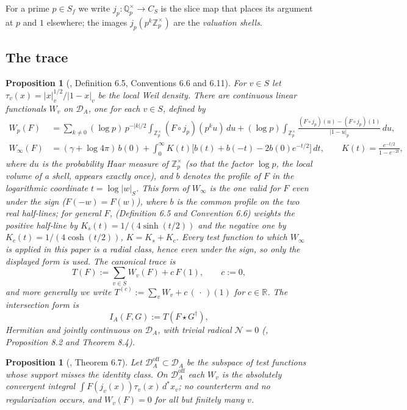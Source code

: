 \documentclass[11pt]{amsart}
\newtheorem{proposition}[theorem]{Proposition}
\theoremstyle{definition}
\theoremstyle{remark}
\newcommand{\R}{\mathbb R}
\newcommand{\Z}{\mathbb Z}
\newcommand{\Q}{\mathbb Q}
\newcommand{\DA}{\mathcal D_A}
\newcommand{\CS}{C_S}
\begin{document}
For a prime $p\in S_f$ we write $j_p\colon\Q_p^\times\to\CS$ is the slice map that
places its argument at $p$ and $1$ elsewhere; the images
$j_p(p^k\Z_p^\times)$ are the \emph{valuation shells}.

\subsection{The trace}

\begin{proposition}[\cite{P43}, Definition 6.5, Conventions 6.6 and 6.11]
\label{prop:trace}
For $v\in S$ let $\tau_v(x)=|x|_v^{1/2}/|1-x|_v$ be the local Weil density.
There are continuous linear functionals $W_v$ on $\DA$, one for each $v\in S$,
defined by
\begin{align*}
  W_p(F)&=\sum_{k\ne0}(\log p)\,p^{-|k|/2}\!\!\int_{\Z_p^\times}\!\!
      (F\circ j_p)(p^ku)\,du
     +(\log p)\!\int_{\Z_p^\times}\!\frac{(F\circ j_p)(u)-(F\circ j_p)(1)}{|1-u|_p}\,du,\\
  W_\infty(F)&=(\gamma+\log4\pi)\,b(0)
     +\int_0^\infty K(t)\bigl[b(t)+b(-t)-2b(0)e^{-t/2}\bigr]\,dt,
  \qquad K(t)=\frac{e^{-t/2}}{1-e^{-2t}},
\end{align*}
where $du$ is the probability Haar measure of $\Z_p^\times$ (so that the
factor $\log p$, the local volume of a shell, appears exactly once), and $b$
denotes the profile of $F$ in the logarithmic coordinate $t=\log|w|_S$.
This form of $W_\infty$ is the one valid for $F$ even under the sign
($F(-w)=F(w)$), where $b$ is the common profile on the two real half-lines;
for general $F$, \cite{P43} (Definition 6.5 and Convention 6.6)
weights the positive half-line by $K_s(t)=1/(4\sinh(t/2))$ and the negative
one by $K_c(t)=1/(4\cosh(t/2))$, $K=K_s+K_c$.  Every test function to which
$W_\infty$ is applied in this paper is a radial class, hence even under the
sign, so only the displayed form is used.  The \emph{canonical trace} is
\[
  T(F):=\sum_{v\in S}W_v(F)+c\,F(1),\qquad c:=0 ,
  \tag{2.3}
\]
and more generally we write $T^{(c)}:=\sum_v W_v+c\,(\,\cdot\,)(1)$ for
$c\in\R$.  The \emph{intersection form} is
\[
  I_A(F,G):=T(F\star G^\dagger),
  \tag{2.4}
\]
Hermitian and jointly continuous on $\DA$, with trivial radical
$\mathcal N=0$ \emph{(\cite{P43}, Proposition 8.2 and Theorem 8.4)}.
\end{proposition}

\begin{proposition}[\cite{P43}, Theorem 6.7]
\label{prop:offidentity}
Let $\DA^{\mathrm{off}}\subset\DA$ be the subspace of test functions whose
support misses the identity class.  On $\DA^{\mathrm{off}}$ each $W_v$ is the
absolutely convergent integral $\int F(j_v(x))\tau_v(x)\,d^*x_v$; no
counterterm and no regularization occurs, and $W_v(F)=0$ for all but finitely
many $v$.
\end{proposition}
\end{document}
